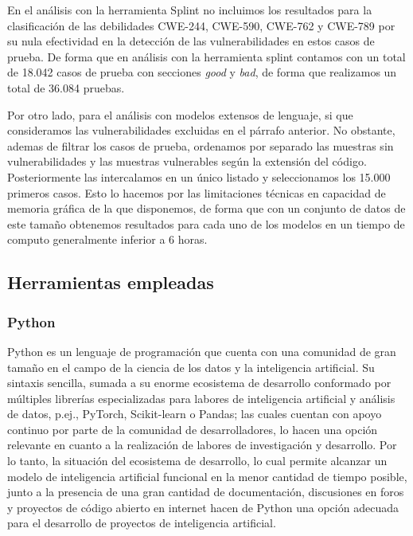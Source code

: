 \documentclass[12pt, a4paper, twoside]{article}
\begin{document}
En el análisis con la herramienta Splint no incluimos los resultados para la clasificación de las debilidades CWE-244, CWE-590, CWE-762 y CWE-789 por su nula efectividad en la detección de las vulnerabilidades en estos casos de prueba. De forma que en análisis con la herramienta splint contamos con un total de 18.042 casos de prueba con secciones \textit{good} y \textit{bad}, de forma que realizamos un total de 36.084 pruebas.

Por otro lado, para el análisis con modelos extensos de lenguaje, si que consideramos las vulnerabilidades excluidas en el párrafo anterior. No obstante, ademas de filtrar los casos de prueba, ordenamos por separado las muestras sin vulnerabilidades y las muestras vulnerables según la extensión del código. Posteriormente las intercalamos en un único listado y seleccionamos los 15.000 primeros casos. Esto lo hacemos por las limitaciones técnicas en capacidad de memoria gráfica de la que disponemos, de forma que con un conjunto de datos de este tamaño obtenemos resultados para cada uno de los modelos en un tiempo de computo generalmente inferior a 6 horas.


\subsection{Herramientas empleadas}
\subsubsection{Python}
Python es un lenguaje de programación que cuenta con una comunidad de gran tamaño en el campo de la ciencia de los datos y la inteligencia artificial. Su sintaxis sencilla, sumada a su enorme ecosistema de desarrollo conformado por múltiples librerías especializadas para labores de inteligencia artificial y análisis de datos, p.ej., PyTorch, Scikit-learn o Pandas; las cuales cuentan con apoyo continuo por parte de la comunidad de desarrolladores, lo hacen una opción relevante en cuanto a la realización de labores de investigación y desarrollo. Por lo tanto, la situación del ecosistema de desarrollo, lo cual permite alcanzar un modelo de inteligencia artificial funcional en la menor cantidad de tiempo posible, junto a la presencia de una gran cantidad de documentación, discusiones en foros y proyectos de código abierto en internet hacen de Python una opción adecuada para el desarrollo de proyectos de inteligencia artificial.
\end{document}
